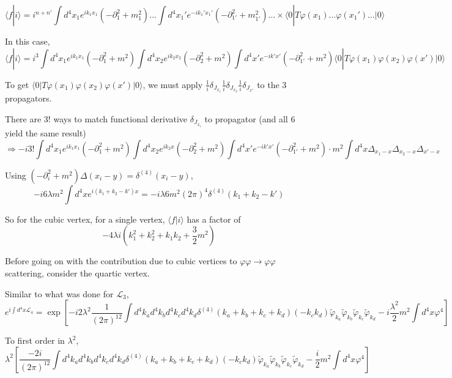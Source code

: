 \documentclass[twoside]{amsart}
\begin{document}
\[
\langle f | i \rangle = i^{n + n' } \int d^4x_1 e^{ik_1 x_1} (- \partial_1^2 + m_1^2 ) \dots \int d^4x_1' e^{-ik_1' x_1' } (-\partial_{1'}^2 + m_{1'}^2 ) \dots \times \langle 0 | T \varphi(x_1) \dots \varphi (x_1') \dots | 0 \rangle 
\]

In this case,
\[
\langle f | i \rangle = i^3 \int d^4x_1 e^{ik_1 x_1} ( - \partial_1^2 + m^2 ) \int d^4x_2 e^{ik_2 x_2 } ( - \partial_2^2 + m^2 ) \int d^4x' e^{-ik'x'} ( - \partial_{1'}^2 + m^2 ) \langle 0 | T\varphi(x_1) \varphi(x_2) \varphi(x') | 0 \rangle 
\]

To get $\langle 0 | T\varphi(x_1) \varphi(x_2) \varphi(x') | 0 \rangle $, we must apply $\frac{1}{i} \delta_{J_{x_1} } \frac{1}{i} \delta_{J_{x_2}} \frac{1}{i} \delta_{J_{x'}}$ to the 3 propagators.  

There are $3!$ ways to match functional derivative $\delta_{J_{x_i}}$ to propagator (and all 6 yield the same result)
\[
\Longrightarrow - i 3! \int d^4x_1 e^{ik_1 x_1} ( - \partial_1^2 + m^2 ) \int d^4x_2 e^{ik_2 x} ( - \partial_2^2 + m^2 ) \int d^4x' e^{-ik'x' } ( - \partial_{1'}^2 + m^2 ) \cdot m^2 \int d^4x \Delta_{x_1-x} \Delta_{x_2 - x} \Delta_{x' - x}
\]

Using $( - \partial_i^2  +m^2 ) \Delta(x_i - y) = \delta^{(4)}(x_i - y )$, 
\[
-i 6\lambda  m^2 \int d^4x e^{ i (k_1 + k_2 - k') x}  = -i \lambda 6 m^2 (2\pi)^4 \delta^{(4)}(k_1 + k_2 - k')
\]

So for the cubic vertex, for a single vertex, $\langle f | i \rangle$ has a factor of  
\[
\boxed{ -4 \lambda i ( k_1^2 + k_2^2  + k_1 k_2 + \frac{3}{2} m^2 ) }
\]

Before going on with the contribution due to cubic vertices to  $\varphi \varphi \to \varphi \varphi$ scattering, consider the quartic vertex.  

Similar to what was done for $\mathcal{L}_3$, 
\[
e^{ i \int d^4x \mathcal{L}_4 } = \exp{ \left[ -i 2 \lambda^2 \frac{1}{ (2\pi)^{12} } \int d^4k_a d^4k_b d^4k_c d^4k_d \delta^{(4)}(k_a + k_b +k_c + k_d ) (- k_c k_d) \widetilde{\varphi}_{k_a} \widetilde{\varphi}_{k_b} \widetilde{\varphi}_{k_c} \widetilde{\varphi}_{k_d} - i \frac{ \lambda^2}{2} m^2 \int d^4x \varphi^4 \right] }
\]


To first order in $\lambda^2$, 
\[
\lambda^2 \left[ \frac{ -2 i }{ (2\pi)^{12} } \int d^4k_a d^4k_b d^4k_c d^4k_d \delta^{(4)}(k_a + k_b +k_c + k_d) (- k_c k_d) \widetilde{\varphi}_{k_a} \widetilde{\varphi}_{k_b} \widetilde{\varphi}_{k_c}\widetilde{\varphi}_{k_d} -  \frac{i}{2} m^2 \int d^4x \varphi^4 \right] 
\]
\end{document}
